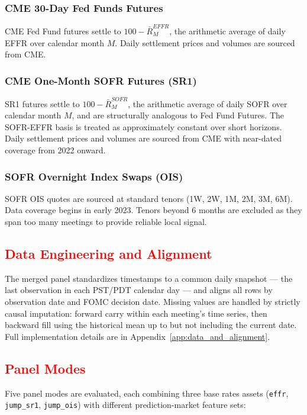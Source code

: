 \subsubsection{CME 30-Day Fed Funds Futures}

CME Fed Fund futures settle to $100 - \bar{R}^{EFFR}_M$, the arithmetic average of daily EFFR over calendar month $M$. Daily settlement prices and volumes are sourced from CME.

\subsubsection{CME One-Month SOFR Futures (SR1)}

SR1 futures settle to $100 - \bar{R}^{SOFR}_M$, the arithmetic average of daily SOFR over calendar month $M$, and are structurally analogous to Fed Fund Futures. The SOFR-EFFR basis is treated as approximately constant over short horizons. Daily settlement prices and volumes are sourced from CME with near-dated coverage from 2022 onward.

\subsubsection{SOFR Overnight Index Swaps (OIS)}

SOFR OIS quotes are sourced at standard tenors (1W, 2W, 1M, 2M, 3M, 6M). Data coverage begins in early 2023. Tenors beyond 6 months are excluded as they span too many meetings to provide reliable local signal.

\subsection{\textcolor{red}{Data Engineering and Alignment}}

The merged panel standardizes timestamps to a common daily snapshot — the last observation in each PST/PDT calendar day — and aligns all rows by observation date and FOMC decision date. Missing values are handled by strictly causal imputation: forward carry within each meeting's time series, then backward fill using the historical mean up to but not including the current date. Full implementation details are in Appendix~\ref{app:data_and_alignment}.

\subsection{\textcolor{red}{Panel Modes}}

Five panel modes are evaluated, each combining three base rates assets (\texttt{effr}, \texttt{jump\_sr1}, \texttt{jump\_ois}) with different prediction-market feature sets:

